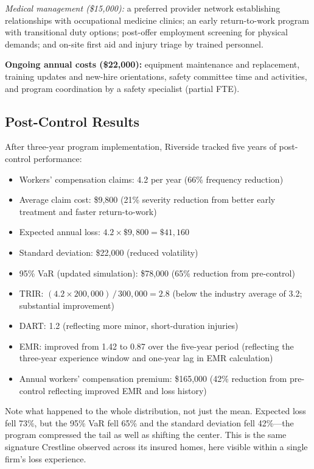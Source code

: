 \documentclass[11pt,openany]{book}
\providecommand{\tightlist}{\setlength{\itemsep}{0pt}\setlength{\parskip}{0pt}}
\begin{document}
\emph{Medical management (\$15{,}000):} a preferred provider network
establishing relationships with occupational medicine clinics; an early
return-to-work program with transitional duty options; post-offer employment
screening for physical demands; and on-site first aid and injury triage by
trained personnel.

\textbf{Ongoing annual costs (\$22{,}000):} equipment maintenance and
replacement, training updates and new-hire orientations, safety committee time
and activities, and program coordination by a safety specialist (partial FTE).

\subsection{Post-Control Results}

After three-year program implementation, Riverside tracked five years of
post-control performance:

\begin{itemize}\tightlist
  \item Workers' compensation claims: 4.2 per year (66\% frequency reduction)
  \item Average claim cost: \$9{,}800 (21\% severity reduction from better
        early treatment and faster return-to-work)
  \item Expected annual loss: \(4.2 \times \$9{,}800 = \$41{,}160\)
  \item Standard deviation: \$22{,}000 (reduced volatility)
  \item 95\% VaR (updated simulation): \$78{,}000 (65\% reduction from
        pre-control)
  \item TRIR: \((4.2 \times 200{,}000)\,/\,300{,}000 = 2.8\) (below the
        industry average of 3.2; substantial improvement)
  \item DART: 1.2 (reflecting more minor, short-duration injuries)
  \item EMR: improved from 1.42 to 0.87 over the five-year period (reflecting
        the three-year experience window and one-year lag in EMR calculation)
  \item Annual workers' compensation premium: \$165{,}000 (42\% reduction from
        pre-control reflecting improved EMR and loss history)
\end{itemize}

Note what happened to the whole distribution, not just the mean. Expected loss
fell 73\%, but the 95\% VaR fell 65\% and the standard deviation fell
42\%---the program compressed the tail as well as shifting the center. This is
the same signature Crestline observed across its insured homes, here visible
within a single firm's loss experience.
\end{document}
